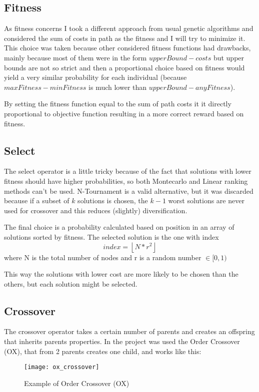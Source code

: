 	\subsection{Fitness}
		As fitness concerns I took a different approach from usual genetic algorithms and considered the sum of costs in path as the fitness and I will try to minimize it.
		This choice was taken because other considered fitness functions had drawbacks, mainly because most of them were in the form $upperBound - costs$ but upper bounds are not so strict and then a proportional choice based on fitness would yield a very similar probability for each individual (because $maxFitness - minFitness$ is much lower than $upperBound - anyFitness$).
		
		By setting the fitness function equal to the sum of path costs it it directly proportional to objective function resulting in a more correct reward based on fitness.
		
	\subsection{Select}
		The select operator is a little tricky because of the fact that solutions with lower fitness should have higher probabilities, so both Montecarlo and Linear ranking methods can't be used. N-Tournament is a valid alternative, but it was discarded because if a subset of $k$ solutions is chosen, the $k-1$ worst solutions are never used for crossover and this reduces (slightly) diversification.
		
		The final choice is a probability calculated based on position in an array of solutions sorted by fitness. The selected solution is the one with index
		\[index = \left \lfloor{N * r^{2}}\right \rfloor\]
		where N is the total number of nodes and r is a random number $\in [0, 1)$
		
		This way the solutions with lower cost are more likely to be chosen than the others, but each solution might be selected.
		
	\subsection{Crossover}
		The crossover operator takes a certain number of parents and creates an offspring that inherits parents properties. In the project was used the Order Crossover (OX), that from 2 parents creates one child, and works like this:
		
		\begin{figure}[h]
		\texttt{[image: ox\_crossover]}
		\centering
		\caption{Example of Order Crossover (OX)}
		\end{figure}
		
